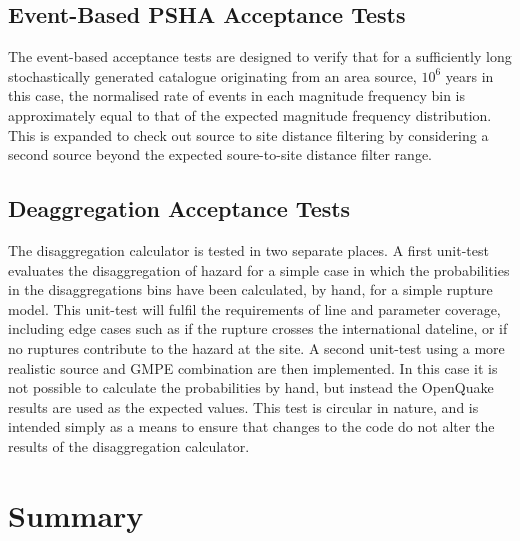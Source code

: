 \subsection{Event-Based PSHA Acceptance Tests}

The event-based acceptance tests are designed to verify that for a sufficiently long stochastically generated catalogue originating from an area source, $10^6$ years in this case, the normalised rate of events in each magnitude frequency bin is approximately equal to that of the expected magnitude frequency distribution. This is expanded to check out source to site distance filtering by considering a second source beyond the expected soure-to-site distance filter range. 

\subsection{Deaggregation Acceptance Tests}

The disaggregation calculator is tested in two separate places. A first unit-test evaluates the disaggregation of hazard for a simple case in which the probabilities in the disaggregations bins have been calculated, by hand, for a simple rupture model. This unit-test will fulfil the requirements of line and parameter coverage, including edge cases such as if the rupture crosses the international dateline, or if no ruptures contribute to the hazard at the site. A second unit-test using a more realistic source and GMPE combination are then implemented. In this case it is not possible to calculate the probabilities by hand, but instead the OpenQuake results are used as the expected values. This test is circular in nature, and is intended simply as a means to ensure that changes to the code do not alter the results of the disaggregation calculator.

\section{Summary}

